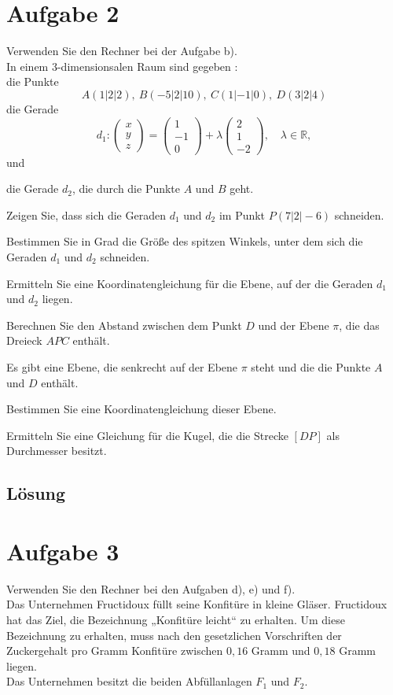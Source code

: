 \documentclass{article}
\begin{document}
\section*{Aufgabe 2}
Verwenden Sie den Rechner bei der Aufgabe b). \\
In einem 3-dimensionsalen Raum sind gegeben : \\
die Punkte
\[A(1|2|2),\: B(-5|2|10),\: C(1|-1|0),\: D(3|2|4) \]
die Gerade
\[
    d_1 : \begin{pmatrix} x \\ y \\ z \end{pmatrix}
    = \begin{pmatrix} 1 \\ -1 \\ 0 \end{pmatrix}
    + \lambda \begin{pmatrix} 2 \\ 1 \\ -2 \end{pmatrix}, \quad \lambda \in \mathbb{R},
\]
und
\begin{center}
    die Gerade \(d_2\), die durch die Punkte \(A\) und \(B\) geht.
\end{center}
\begin{tasks}
    \task Zeigen Sie, dass sich die Geraden \(d_1\) und \(d_2\) im Punkt \(P(7|2|-6)\) schneiden.

    \task Bestimmen Sie in Grad die Größe des spitzen Winkels, unter dem sich die Geraden \(d_1\) und \(d_2\) schneiden.

    \task Ermitteln Sie eine Koordinatengleichung für die Ebene, auf der die Geraden \(d_1\) und \(d_2\) liegen.

    \task Berechnen Sie den Abstand zwischen dem Punkt \(D\) und der Ebene \(\pi\), die das Dreieck \(APC\) enthält.

    \task Es gibt eine Ebene, die senkrecht auf der Ebene \(\pi\) steht und die die Punkte \(A\) und \(D\) enthält.

    Bestimmen Sie eine Koordinatengleichung dieser Ebene.

    \task Ermitteln Sie eine Gleichung für die Kugel, die die Strecke \([DP]\) als Durchmesser besitzt.
\end{tasks}
\subsection*{Lösung}

\newpage
\section*{Aufgabe 3}
Verwenden Sie den Rechner bei den Aufgaben d), e) und f). \\
Das Unternehmen Fructidoux füllt seine Konfitüre in kleine Gläser.
Fructidoux hat das Ziel, die Bezeichnung „Konfitüre leicht`` zu erhalten. Um
diese Bezeichnung zu erhalten, muss nach den gesetzlichen Vorschriften
der Zuckergehalt pro Gramm Konfitüre zwischen \(0{,}16\) Gramm und
\(0{,}18\) Gramm liegen. \\
Das Unternehmen besitzt die beiden Abfüllanlagen \(F_1\) und \(F_2\).
\end{document}

